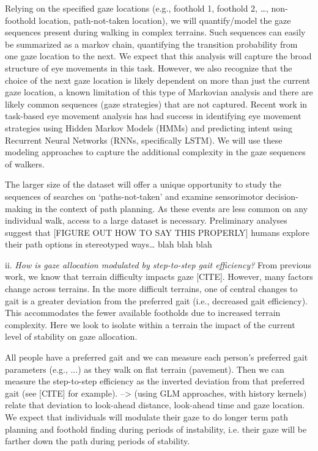 Relying on the specified gaze locations (e.g., foothold 1, foothold 2, \ldots, non-foothold location, path-not-taken location), we will quantify/model the gaze sequences present during walking in complex terrains. Such sequences can easily be summarized as a markov chain, quantifying the transition probability from one gaze location to the next. We expect that this analysis will capture the broad structure of eye movements in this task. However, we also recognize that the choice of the next gaze location is likely dependent on more than just the current gaze location, a known limitation of this type of Markovian analysis and there are likely common sequences (gaze strategies) that are not captured. Recent work in task-based eye movement analysis has had success in identifying eye movement strategies using Hidden Markov Models (HMMs) and predicting intent using Recurrent Neural Networks (RNNs, specifically LSTM). We will use these modeling approaches to capture the additional complexity in the gaze sequences of walkers.

The larger size of the dataset will offer a unique opportunity to study the sequences of searches on `paths-not-taken' and examine sensorimotor decision-making in the context of path planning. As these events are less common on any individual walk, access to a large dataset is necessary. Preliminary analyses suggest that [FIGURE OUT HOW TO SAY THIS PROPERLY] humans explore their path options in stereotyped ways\ldots{} blah blah blah

ii. \emph{How is gaze allocation modulated by step-to-step gait
efficiency?} From previous work, we know that terrain difficulty impacts gaze [CITE]. However, many factors change across terrains. In the more difficult terrains, one of central changes to gait is a greater deviation from the preferred gait (i.e., decreased gait efficiency). This accommodates the fewer available footholds due to increased terrain complexity. Here we look to isolate within a terrain the impact of the current level of stability on gaze allocation.

All people have a preferred gait and we can measure each person's preferred gait parameters (e.g., ...) as they walk on flat terrain (pavement). Then we can measure the step-to-step efficiency as the inverted deviation from that preferred gait (see [CITE] for example).  --> (using GLM approaches, with history kernels) relate that deviation to look-ahead distance, look-ahead time and gaze location. We expect that individuals will modulate their gaze to do longer term path planning and foothold finding during periods of instability, i.e. their gaze will be farther down the path during periods of stability.


